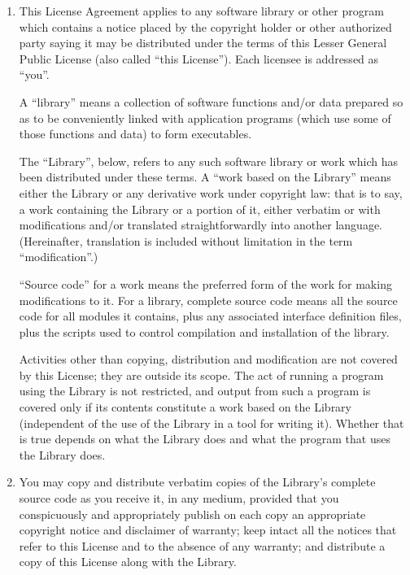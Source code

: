 \documentclass[12pt]{report}
\begin{document}
\begin{enumerate}

\addtocounter{enumi}{-1}

\item

This License Agreement applies to any software library or other program
which contains a notice placed by the copyright holder or other authorized
party saying it may be distributed under the terms of this Lesser General
Public License (also called ``this License'').  Each licensee is addressed
as ``you''.

A ``library'' means a collection of software functions and/or data
prepared so as to be conveniently linked with application programs (which
use some of those functions and data) to form executables.

The ``Library'', below, refers to any such software library or work which
has been distributed under these terms.  A ``work based on the Library''
means either the Library or any derivative work under copyright law: that
is to say, a work containing the Library or a portion of it, either
verbatim or with modifications and/or translated straightforwardly into
another language.  (Hereinafter, translation is included without
limitation in the term ``modification''.)

``Source code'' for a work means the preferred form of the work for making
modifications to it.  For a library, complete source code means all the
source code for all modules it contains, plus any associated interface
definition files, plus the scripts used to control compilation and
installation of the library.

Activities other than copying, distribution and modification are not
covered by this License; they are outside its scope.  The act of running a
program using the Library is not restricted, and output from such a
program is covered only if its contents constitute a work based on the
Library (independent of the use of the Library in a tool for writing it).
Whether that is true depends on what the Library does and what the program
that uses the Library does.
  
\item 

You may copy and distribute verbatim copies of the Library's complete
source code as you receive it, in any medium, provided that you
conspicuously and appropriately publish on each copy an appropriate
copyright notice and disclaimer of warranty; keep intact all the notices
that refer to this License and to the absence of any warranty; and
distribute a copy of this License along with the Library.


\end{enumerate}
\end{document}
